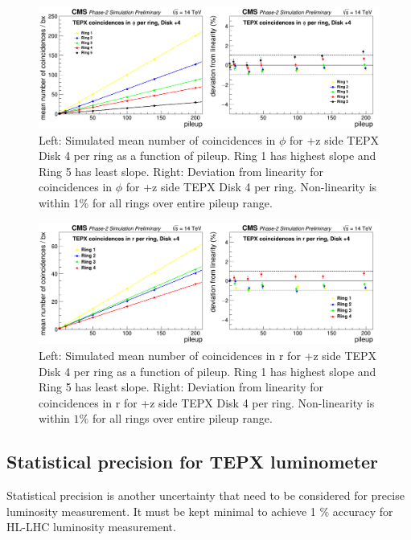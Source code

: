 \begin{figure}[H]
  \centering
  \includegraphics[width=1\columnwidth]{./coincidencesinphiperringD+4.png}
  \caption{Left: Simulated mean number of coincidences in $\phi$ for +z side TEPX Disk 4 per ring as a function of pileup. Ring 1 has highest slope and Ring 5 has least slope. Right: Deviation from linearity for coincidences in $\phi$ for +z side TEPX Disk 4 per ring. Non-linearity is within 1\% for all rings over entire pileup range.}
  \label{fig:CMS}
\end{figure}





\begin{figure}[H]
  \centering
  \includegraphics[width=1\columnwidth]{./coincidencesinrperringD+4.png}
  \caption{Left: Simulated mean number of coincidences in r for +z side TEPX Disk 4 per ring as a function of pileup. Ring 1 has highest slope and Ring 5 has least slope. Right: Deviation from linearity for coincidences in r for +z side TEPX Disk 4 per ring. Non-linearity is within $1\%$ for all rings over entire pileup range.}
  \label{fig:CMS}
\end{figure}


\subsection{Statistical precision for TEPX luminometer}
Statistical precision is another uncertainty that need to be considered for precise luminosity measurement. It must be kept minimal to achieve 1 $\%$ accuracy for HL-LHC luminosity measurement. \\


